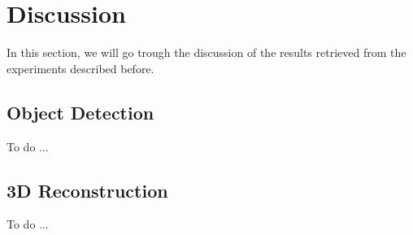 \section{Discussion}\label{sec:exp_discussion}
In this section, we will go trough the discussion of the results retrieved from the experiments described before.

\subsection{Object Detection}\label{subsec:obj_det_discussion}
To do ...

\subsection{3D Reconstruction}\label{subsec:3d_rec_discussion}
To do ...